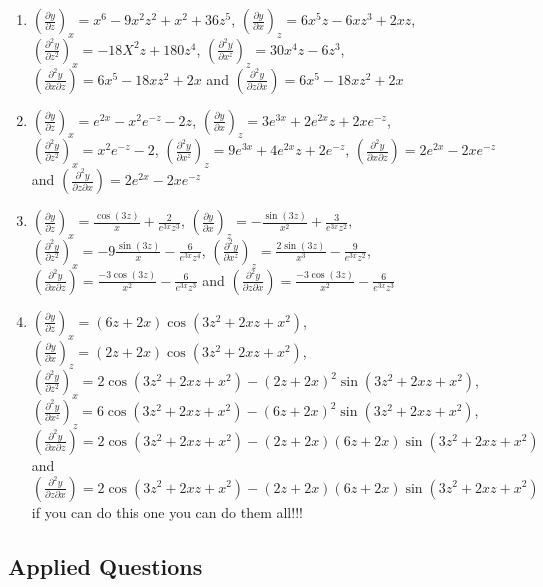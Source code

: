 \documentclass[
]{book}
\begin{document}
\begin{enumerate}
\def\labelenumi{\arabic{enumi}.}
\item
  \(\left(\frac{\partial y}{\partial z}\right)_x= x^6-9x^2z^2+x^2+36z^5\),
  \(\left(\frac{\partial y}{\partial x}\right)_z=6x^5z-6xz^3+2xz\),
  \(\left(\frac{\partial^2 y}{\partial z^2}\right)_x=-18X^2z+180z^4\),
  \(\left(\frac{\partial^2 y}{\partial x^z}\right)_z=30x^4z-6z^3\),
  \(\left(\frac{\partial^2 y}{\partial x \partial z}\right)=6x^5-18xz^2+2x\) and
  \(\left(\frac{\partial^2 y}{\partial z \partial x}\right)=6x^5-18xz^2+2x\)
\item
  \(\left(\frac{\partial y}{\partial z}\right)_x=e^{2x}-x^2e^{-z}-2z\),
  \(\left(\frac{\partial y}{\partial x}\right)_z=3e^{3x}+2e^{2x}z+2xe^{-z}\),
  \(\left(\frac{\partial^2 y}{\partial z^2}\right)_x=x^2e^{-z}-2\),
  \(\left(\frac{\partial^2 y}{\partial x^z}\right)_z=9e^{3x}+4e^{2x}z+ 2e^{-z}\),
  \(\left(\frac{\partial^2 y}{\partial x \partial z}\right)=2e^{2x}-2xe^{-z}\) and
  \(\left(\frac{\partial^2 y}{\partial z \partial x}\right)=2e^{2x}-2xe^{-z}\)
\item
  \(\left(\frac{\partial y}{\partial z}\right)_x=\frac{\cos (3z)}{x}+\frac{2}{e^{3x}z^3}\),
  \(\left(\frac{\partial y}{\partial x}\right)_z=-\frac{\sin (3z)}{x^2}+\frac{3}{e^{3x}z^2}\),
  \(\left(\frac{\partial^2 y}{\partial z^2}\right)_x=-9\frac{\sin (3z)}{x}-\frac{6}{e^{3x}z^4}\),
  \(\left(\frac{\partial^2 y}{\partial x^z}\right)_z=\frac{2\sin (3z)}{x^3}-\frac{9}{e^{3x}z^2}\),
  \(\left(\frac{\partial^2 y}{\partial x \partial z}\right)=\frac{-3\cos (3z)}{x^2}-\frac{6}{e^{3x}z^3}\) and
  \(\left(\frac{\partial^2 y}{\partial z \partial x}\right)=\frac{-3\cos (3z)}{x^2}-\frac{6}{e^{3x}z^3}\)
\item
  \(\left(\frac{\partial y}{\partial z}\right)_x=(6z+2x)\cos(3z^2+2xz+x^2)\),
  \(\left(\frac{\partial y}{\partial x}\right)_z=(2z+2x)\cos(3z^2+2xz+x^2)\),
  \(\left(\frac{\partial^2 y}{\partial z^2}\right)_x=2\cos(3z^2+2xz+x^2)-(2z+2x)^2\sin(3z^2+2xz+x^2)\),
  \(\left(\frac{\partial^2 y}{\partial x^z}\right)_z=6\cos(3z^2+2xz+x^2)-(6z+2x)^2\sin(3z^2+2xz+x^2)\),
  \(\left(\frac{\partial^2 y}{\partial x \partial z}\right)=2\cos(3z^2+2xz+x^2)-(2z+2x)(6z+2x)\sin(3z^2+2xz+x^2)\) and
  \(\left(\frac{\partial^2 y}{\partial z \partial x}\right)=2\cos(3z^2+2xz+x^2)-(2z+2x)(6z+2x)\sin(3z^2+2xz+x^2)\) if you can do this one you can do them all!!!
\end{enumerate}

\hypertarget{applied-questions-3}{%
\subsection{Applied Questions}\label{applied-questions-3}}
\end{document}
